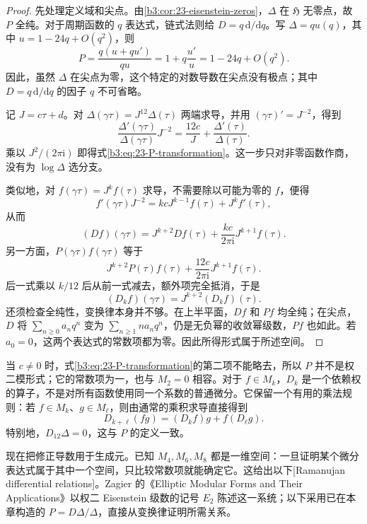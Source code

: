 \begin{proof}
先处理定义域和尖点。由\cref{b3:cor:23-eisenstein-zeros}，\(\Delta\) 在 \(\mathfrak H\) 无零点，故 \(P\) 全纯。对于周期函数的 \(q\) 表达式，链式法则给 \(D=q\,\mathrm{d}/\mathrm{d}q\)。写 \(\Delta=qu(q)\)，其中 \(u=1-24q+O(q^2)\)，则
\[
 P=\frac{q(u+qu')}{qu}=1+q\frac{u'}{u}
 =1-24q+O(q^2).
\]
因此，虽然 \(\Delta\) 在尖点为零，这个特定的对数导数在尖点没有极点；其中 \(D=q\,\mathrm{d}/\mathrm{d}q\) 的因子 \(q\) 不可省略。

记 \(J=c\tau+d\)。对 \(\Delta(\gamma\tau)=J^{12}\Delta(\tau)\) 两端求导，并用 \((\gamma\tau)'=J^{-2}\)，得到
\[
 \frac{\Delta'(\gamma\tau)}{\Delta(\gamma\tau)}J^{-2}
 =\frac{12c}{J}+\frac{\Delta'(\tau)}{\Delta(\tau)}.
\]
乘以 \(J^2/(2\pi\mathrm{i})\) 即得式\eqref{b3:eq:23-P-transformation}。这一步只对非零函数作商，没有为 \(\log\Delta\) 选分支。

类似地，对 \(f(\gamma\tau)=J^k f(\tau)\) 求导，不需要除以可能为零的 \(f\)，便得
\[
 f'(\gamma\tau)J^{-2}
 =kcJ^{k-1}f(\tau)+J^k f'(\tau),
\]
从而
\[
 (Df)(\gamma\tau)=J^{k+2}Df(\tau)
 +\frac{kc}{2\pi\mathrm{i}}J^{k+1}f(\tau).
\]
另一方面，\(P(\gamma\tau)f(\gamma\tau)\) 等于
\[
 J^{k+2}P(\tau)f(\tau)
 +\frac{12c}{2\pi\mathrm{i}}J^{k+1}f(\tau).
\]
后一式乘以 \(k/12\) 后从前一式减去，额外项完全抵消，于是
\[
 (D_kf)(\gamma\tau)=J^{k+2}(D_kf)(\tau).
\]
还须检查全纯性，变换律本身并不够。在上半平面，\(Df\) 和 \(Pf\) 均全纯；在尖点，\(D\) 将 \(\sum_{n\ge0}a_nq^n\) 变为 \(\sum_{n\ge1}na_nq^n\)，仍是无负幂的收敛幂级数，\(Pf\) 也如此。若 \(a_0=0\)，这两个表达式的常数项都为零。因此所得形式属于所述空间。
\end{proof}

当 \(c\ne0\) 时，式\eqref{b3:eq:23-P-transformation}的第二项不能略去，所以 \(P\) 并不是权二模形式；它的常数项为一，也与 \(M_2=0\) 相容。对于 \(f\in M_k\)，\(D_k\) 是一个依赖权的算子，不是对所有函数使用同一个系数的普通微分。它保留一个有用的乘法规则：若 \(f\in M_k\)、\(g\in M_\ell\)，则由通常的乘积求导直接得到
\[
 D_{k+\ell}(fg)=(D_kf)g+f(D_\ell g).
\]
特别地，\(D_{12}\Delta=0\)，这与 \(P\) 的定义一致。

\ProseParagraphBreak

现在把修正导数用于生成元。已知 \(M_4,M_6,M_8\) 都是一维空间：一旦证明某个微分表达式属于其中一个空间，只比较常数项就能确定它。这给出以下[Ramanujan differential relations]。Zagier 的《Elliptic Modular Forms and Their Applications》\cite[Proposition 15, p. 49]{Zagier2008Elliptic}以权二 Eisenstein 级数的记号 \(E_2\) 陈述这一系统；以下采用已在本章构造的 \(P=D\Delta/\Delta\)，直接从变换律证明所需关系。

